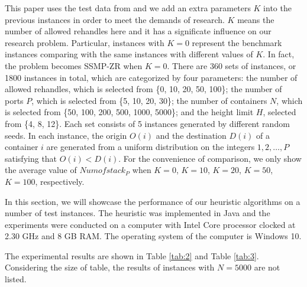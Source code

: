 \documentclass[review,3p,times,authoryear,12pt]{elsarticle}
\begin{document}
This paper uses the test data from \cite{wang2014stowage} and we add an extra parameters $K$ into the previous instances in order to meet the demands of research.
$K$ means the number of allowed rehandles here and it has a significate influence on our research problem.
Particular, instances with $K=0$ represent the benchmark instances comparing with the same instances with different values of $K$.
In fact, the problem becomes SSMP-ZR when $K=0$.
There are 360 sets of instances, or 1800 instances in total, which are categorized by four parameters: the number of allowed rehandles, which is selected from \{0, 10, 20, 50, 100\};
the number of ports $P$, which is selected from \{5, 10, 20, 30\};
the number of containers $N$, which is selected from \{50, 100, 200, 500, 1000, 5000\};
and the height limit $H$, selected from \{4, 8, 12\}.
Each set consists of 5 instances generated by different random seeds.
In each instance, the origin $O(i)$ and the destination $D(i)$ of a container $i$ are generated from a uniform distribution on the integers $1, 2, \ldots, P$ satisfying that $O(i)<D(i)$.
For the convenience of comparison, we only show the average value of $Numofstack_P$ when $K=0$, $K=10$, $K=20$, $K=50$, $K=100$, respectively.

In this section, we will showcase the performance of our heuristic algorithms on a number of test instances.
The heuristic was implemented in Java and the experiments were conducted on a computer with Intel Core processor clocked at 2.30 GHz and 8 GB RAM.
The operating system of the computer is Windows 10.

The experimental results are shown in Table \ref{tab:2} and Table \ref{tab:3}.
Considering the size of table, the results of instances with $N=5000$ are not listed.
\end{document}

